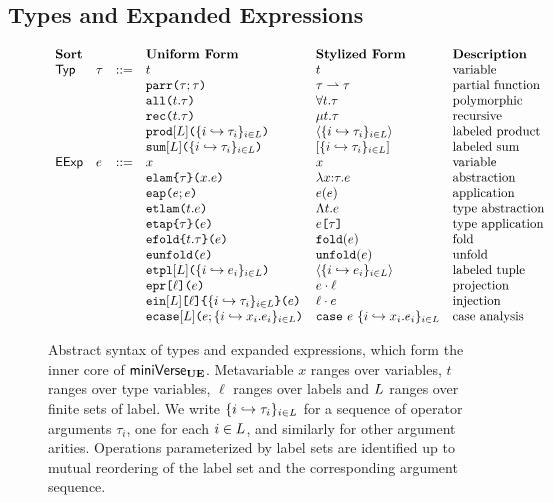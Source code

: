 \subsection{Types and Expanded Expressions}\label{sec:U-expanded-terms}

\begin{figure}
$\begin{array}{lllllll}
\textbf{Sort} & & & \textbf{Uniform Form} & \textbf{Stylized Form} & \textbf{Description}\\
\mathsf{Typ} & \tau & ::= & t & t & \text{variable}\\
&&& \texttt{parr}\texttt{(}\tau; \tau\texttt{)} & \tau \rightharpoonup \tau & \text{partial function}\\
&&& \texttt{all}\texttt{(}t.\tau\texttt{)} & \forall t.\tau & \text{polymorphic}\\
&&& \texttt{rec}\texttt{(}t.\tau\texttt{)} & \mu t.\tau & \text{recursive}\\
&&& \texttt{prod}[L]\texttt{(}\{i \hookrightarrow \tau_{i}\}_{i \in L}\texttt{)} & \langle \{i \hookrightarrow \tau_{i}\}_{i \in L} \rangle & \text{labeled product}\\
&&& \texttt{sum}[L]\texttt{(}\{i \hookrightarrow \tau_{i}\}_{i \in L}\texttt{)} & [\{i \hookrightarrow \tau_{i}\}_{i \in L}] & \text{labeled sum}\\
\mathsf{EExp} & e & ::= & x & x & \text{variable}\\
&&& \texttt{elam}\texttt{\{}\tau\texttt{\}(}x.e\texttt{)} & \lambda x{:}\tau.e & \text{abstraction}\\
&&& \texttt{eap}\texttt{(}e; e\texttt{)} & e(e) & \text{application}\\
&&& \texttt{etlam}\texttt{(}t.e\texttt{)} & \Lambda t.e & \text{type abstraction}\\
&&& \texttt{etap}\texttt{\{}\tau\texttt{\}(}e\texttt{)} & e\texttt{[}\tau\texttt{]} & \text{type application}\\
&&& \texttt{efold}\texttt{\{}t.\tau\texttt{\}(}e\texttt{)} & \texttt{fold}(e) & \text{fold}\\
&&& \texttt{eunfold}\texttt{(}e\texttt{)} & \texttt{unfold}(e) & \text{unfold}\\
&&& \texttt{etpl}[L]\texttt{(}\{i \hookrightarrow e_{i}\}_{i \in L}\texttt{)} & \langle \{i \hookrightarrow e_{i}\}_{i \in L}\rangle & \text{labeled tuple}\\
&&& \texttt{epr}\texttt{[}\ell\texttt{](}e\texttt{)} & e \cdot \ell & \text{projection}\\
&&& \texttt{ein}[L]\texttt{[}\ell\texttt{]\{}\{i \hookrightarrow \tau_{i}\}_{i \in L}\texttt{\}(}e\texttt{)} & \ell \cdot e & \text{injection}\\
&&& \texttt{ecase}[L]\texttt{(}e; \{i \hookrightarrow x_{i}.e_{i}\}_{i \in L}\texttt{)} & \texttt{case}~e~\{i \hookrightarrow x_{i}.e_{i}\}_{i \in L} & \text{case analysis}
\end{array}$
\caption[Syntax of types and expanded expressions in $\miniVerseUE$.]{Abstract syntax of types and expanded expressions, which form the inner core of $\miniVerseUE$. Metavariable $x$ ranges over variables, $t$ ranges over type variables, $\ell$ ranges over labels and $L$ ranges over finite sets of label. We write $\{i \hookrightarrow \tau_{i}\}_{i \in L}$ for a sequence of operator arguments $\tau_i$, one for each $i\in L$, and similarly for other argument arities. Operations parameterized by label sets are identified up to mutual reordering of the label set and the corresponding argument sequence. %
}
\end{figure}
